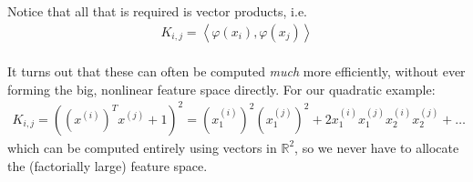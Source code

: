 Notice that all that is required is vector products, i.e.
\begin{align*}
K_{i,j} =  \left\langle \varphi(x_i),\varphi(x_j) \right\rangle 
\end{align*}  \\$ $\\ It turns out that these can often be computed \emph{much} more efficiently, without ever forming the big, nonlinear feature space directly. \pause{}For our quadratic example:
\begin{align*}
K_{i,j} = \left((x^{(i)})^Tx^{(j)} +1\right)^2 = (x_{1}^{(i)})^2(x_{1}^{(j)})^2  + 2x_{1}^{(i)}x_{1}^{(j)}x_{2}^{(i)}x_{2}^{(j)}+ \hdots 
\end{align*}
\pause{}
which {can be computed entirely using vectors in} $\mathbb{R}^2$, so we never have to allocate the (factorially large) feature space.\\

